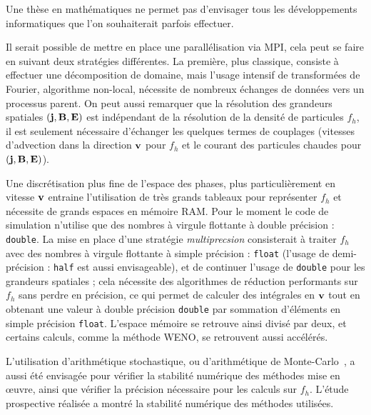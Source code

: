 
Une thèse en mathématiques ne permet pas d'envisager tous les développements informatiques que l'on souhaiterait parfois effectuer.

Il serait possible de mettre en place une parallélisation via MPI, cela peut se faire en suivant deux stratégies différentes. La première, plus classique, consiste à effectuer une décomposition de domaine, mais l'usage intensif de transformées de Fourier, algorithme non-local, nécessite de nombreux échanges de données vers un processus parent. On peut aussi remarquer que la résolution des grandeurs spatiales $(\vb{j},\vb{B},\vb{E})$ est indépendant de la résolution de la densité de particules $f_h$, il est seulement nécessaire d'échanger les quelques termes de couplages (vitesses d'advection dans la direction $\vb{v}$ pour $f_h$ et le courant des particules chaudes pour $(\vb{j},\vb{B},\vb{E})$).

Une discrétisation plus fine de l'espace des phases, plus particulièrement en vitesse $\vb{v}$ entraine l'utilisation de très grands tableaux pour représenter $f_h$ et nécessite de grands espaces en mémoire RAM. Pour le moment le code de simulation n'utilise que des nombres à virgule flottante à double précision : \texttt{double}. La mise en place d'une stratégie \emph{multiprecsion} consisterait à traiter $f_h$ avec des nombres à virgule flottante à simple précision : \texttt{float} (l'usage de demi-précision : \texttt{half} est aussi envisageable), et de continuer l'usage de \texttt{double} pour les grandeurs spatiales ; cela nécessite des algorithmes de réduction performants sur $f_h$ sans perdre en précision, ce qui permet de calculer des intégrales en $\vb{v}$ tout en obtenant une valeur à double précision \texttt{double} par sommation d'éléments en simple précision \texttt{float}. L'espace mémoire se retrouve ainsi divisé par deux, et certains calculs, comme la méthode WENO, se retrouvent aussi accélérés.

L'utilisation d'arithmétique stochastique, ou d'arithmétique de Monte-Carlo~\cite{Parker:1997,Parker:1997a}, a aussi été envisagée pour vérifier la stabilité numérique des méthodes mise en œuvre, ainsi que vérifier la précision nécessaire pour les calculs sur $f_h$. L'étude prospective réalisée a montré la stabilité numérique des méthodes utilisées.
